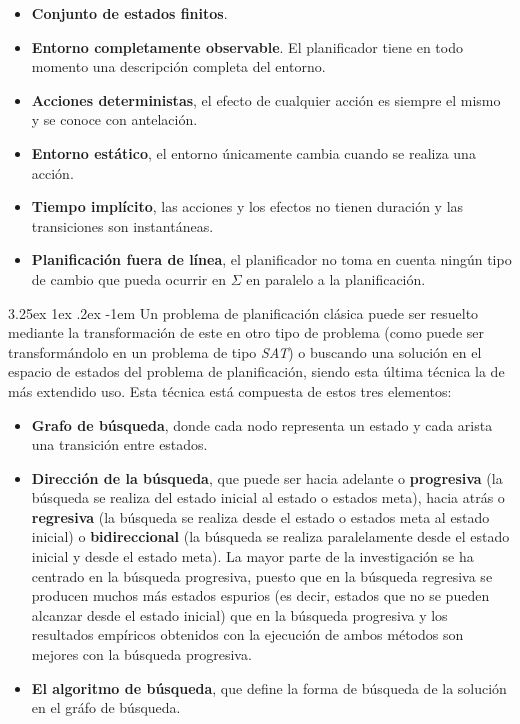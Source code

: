 \documentclass{article}
\makeatletter
\renewcommand\paragraph{\@startsection{paragraph}{5}{\z@}%
      {3.25ex \@plus1ex \@minus.2ex}%
      {-1em}%
      {\normalfont\normalsize\bfseries}}
\makeatother
\begin{document}
    \begin{itemize}
        \item \textbf{Conjunto de estados finitos}.
        \item \textbf{Entorno completamente observable}. El planificador tiene en todo momento una descripción completa del entorno.    
        \item \textbf{Acciones deterministas}, el efecto de cualquier acción es siempre el mismo y se conoce con antelación.
        \item \textbf{Entorno estático}, el entorno únicamente cambia cuando se realiza una acción.
        \item \textbf{Tiempo implícito}, las acciones y los efectos no tienen duración y las transiciones son instantáneas.
        \item \textbf{Planificación fuera de línea}, el planificador no toma en cuenta ningún tipo de cambio que pueda ocurrir en $\Sigma$ en paralelo a la planificación.
    \end{itemize}
    
    \paragraph{}
    Un problema de planificación clásica puede ser resuelto mediante la transformación de este en otro tipo de problema (como puede ser transformándolo en un problema de tipo \textit{SAT}\cite{sat}) o buscando una solución en el espacio de estados del problema de planificación, siendo esta última técnica la de más extendido uso. Esta técnica está compuesta de estos tres elementos:
    \begin{itemize}
        \item \textbf{Grafo de búsqueda}, donde cada nodo representa un estado y cada arista una transición entre estados.
        \item \textbf{Dirección de la búsqueda}, que puede ser hacia adelante o     \textbf{progresiva} (la búsqueda se realiza del estado inicial al estado o estados meta), hacia atrás o \textbf{regresiva} (la búsqueda se realiza desde el estado o estados meta al estado inicial) o \textbf{bidireccional} (la búsqueda se realiza paralelamente desde el estado inicial y desde el estado meta). La mayor parte de la investigación se ha centrado en la búsqueda progresiva, puesto que en la búsqueda regresiva se producen muchos más estados espurios (es decir, estados que no se pueden alcanzar desde el estado inicial) que en la búsqueda progresiva y los resultados empíricos obtenidos con la ejecución de ambos métodos son mejores con la búsqueda progresiva.
        \item \textbf{El algoritmo de búsqueda}, que define la forma de búsqueda de la solución en el gráfo de búsqueda. 
        
    \end{itemize}
    
\end{document}

